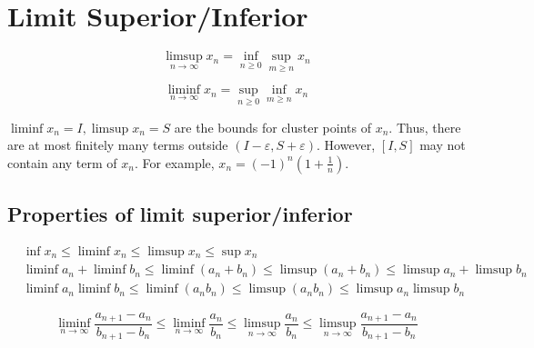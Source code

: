 \section{Limit Superior/Inferior}
\begin{definition}
	\[ \limsup_{n \to \infty} x_n = \inf_{n \ge 0} \sup_{m \ge n} x_n \]
\end{definition}

\begin{definition}
	\[ \liminf_{n \to \infty} x_n = \sup_{n \ge 0} \inf_{m \ge n} x_n \]
\end{definition}

\begin{remark}
	$\liminf x_n  = I,\limsup x_n = S$ are the bounds for cluster points of $x_n$.
	Thus, there are at most finitely many terms outside $(I-\varepsilon,S+\varepsilon)$.
	However, $[I,S]$ may not contain any term of $x_n$.
	For example, $x_n = (-1)^n (1+\frac{1}{n})$.
\end{remark}

\subsection{Properties of limit superior/inferior}
\begin{eqnarray*}
	& \inf x_n \le \liminf x_n \le \limsup x_n \le \sup x_n \\
	& \liminf a_n + \liminf b_n \le \liminf (a_n+b_n) \le \limsup (a_n + b_n) \le \limsup a_n + \limsup b_n  \\
	& \liminf a_n \liminf b_n \le \liminf (a_n b_n) \le \limsup (a_n b_n) \le \limsup a_n \limsup b_n  
\end{eqnarray*}

\begin{theorem}
	\[ \liminf_{n \to \infty} \frac{a_{n+1}-a_n}{b_{n+1}-b_n} \le \liminf_{n \to \infty} \frac{a_n}{b_n} \le \limsup_{n \to \infty} \frac{a_n}{b_n} \le \limsup_{n \to \infty} \frac{a_{n+1}-a_n}{b_{n+1}-b_n} \]
\end{theorem}
